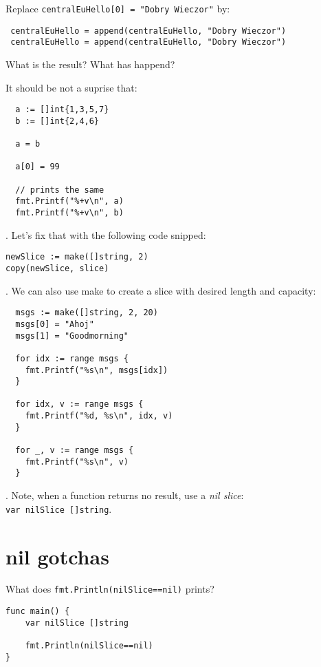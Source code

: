 \documentclass[11pt, letterpaper]{article}
\begin{document}
\bigskip
\bigskip
Replace \texttt{centralEuHello[0] = "Dobry Wieczor"} by:

\begin{verbatim}
 centralEuHello = append(centralEuHello, "Dobry Wieczor")
 centralEuHello = append(centralEuHello, "Dobry Wieczor")
\end{verbatim}

What is the result? What has happend?

\bigskip
\bigskip
\bigskip
It should be not a suprise that:

\begin{verbatim}
  a := []int{1,3,5,7}
  b := []int{2,4,6}

  a = b

  a[0] = 99

  // prints the same
  fmt.Printf("%+v\n", a)
  fmt.Printf("%+v\n", b)
\end{verbatim}

. Let's fix that with the following code snipped:

\begin{verbatim}
newSlice := make([]string, 2)
copy(newSlice, slice)
\end{verbatim}

. We can also use make to create a slice with desired length and capacity:

\begin{verbatim}
  msgs := make([]string, 2, 20)
  msgs[0] = "Ahoj"
  msgs[1] = "Goodmorning"

  for idx := range msgs {
    fmt.Printf("%s\n", msgs[idx])
  }

  for idx, v := range msgs {
    fmt.Printf("%d, %s\n", idx, v)
  }

  for _, v := range msgs {
    fmt.Printf("%s\n", v)
  }
\end{verbatim}

. Note, when a function returns no result, use a \emph{nil slice}:\\ \texttt{var nilSlice []string}.

\section{nil gotchas}

What does \texttt{fmt.Println(nilSlice==nil)} prints?

\begin{verbatim}
func main() {
	var nilSlice []string

	fmt.Println(nilSlice==nil)
}
\end{verbatim}
\end{document}
